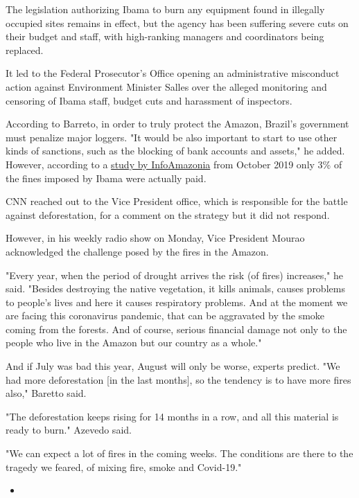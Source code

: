 The legislation authorizing Ibama to burn any equipment found in
illegally occupied sites remains in effect, but the agency has been
suffering severe cuts on their budget and staff, with high-ranking
managers and coordinators being replaced.

It led to the Federal Prosecutor's Office opening an administrative
misconduct action against Environment Minister Salles over the alleged
monitoring and censoring of Ibama staff, budget cuts and harassment of
inspectors.

According to Barreto, in order to truly protect the Amazon, Brazil's
government must penalize major loggers. "It would be also important to
start to use other kinds of sanctions, such as the blocking of bank
accounts and assets," he added. However, according to a
\href{https://theintercept.com/2019/10/21/ibama-bilhoes-multas-ambientais/}{study
by InfoAmazonia} from October 2019 only 3\% of the fines imposed by
Ibama were actually paid.

CNN reached out to the Vice President office, which is responsible for
the battle against deforestation, for a comment on the strategy but it
did not respond.

However, in his weekly radio show on Monday, Vice President Mourao
acknowledged the challenge posed by the fires in the Amazon.

"Every year, when the period of drought arrives the risk (of fires)
increases," he said. "Besides destroying the native vegetation, it kills
animals, causes problems to people's lives and here it causes
respiratory problems. And at the moment we are facing this coronavirus
pandemic, that can be aggravated by the smoke coming from the forests.
And of course, serious financial damage not only to the people who live
in the Amazon but our country as a whole."

And if July was bad this year, August will only be worse, experts
predict. "We had more deforestation {[}in the last months{]}, so the
tendency is to have more fires also," Baretto said.

"The deforestation keeps rising for 14 months in a row, and all this
material is ready to burn." Azevedo said.

"We can expect a lot of fires in the coming weeks. The conditions are
there to the tragedy we feared, of mixing fire, smoke and Covid-19."

\begin{itemize}
\item
\end{itemize}

